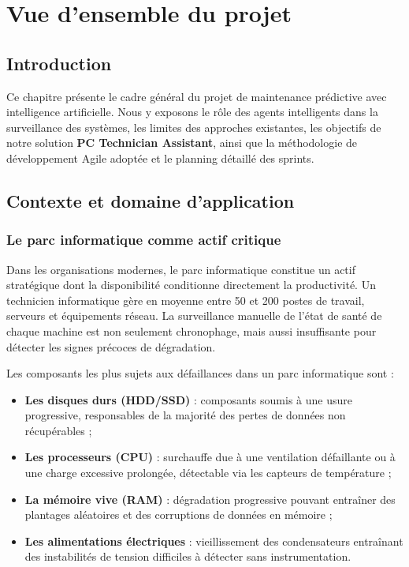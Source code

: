 \chapter{Vue d'ensemble du projet}

\section{Introduction}

Ce chapitre présente le cadre général du projet de maintenance prédictive avec intelligence
artificielle. Nous y exposons le rôle des agents intelligents dans la surveillance des
systèmes, les limites des approches existantes, les objectifs de notre solution
\textbf{PC Technician Assistant}, ainsi que la méthodologie de développement Agile adoptée
et le planning détaillé des sprints.

\section{Contexte et domaine d'application}

\subsection{Le parc informatique comme actif critique}

Dans les organisations modernes, le parc informatique constitue un actif stratégique dont
la disponibilité conditionne directement la productivité. Un technicien informatique gère
en moyenne entre 50 et 200 postes de travail, serveurs et équipements réseau. La surveillance
manuelle de l'état de santé de chaque machine est non seulement chronophage, mais aussi
insuffisante pour détecter les signes précoces de dégradation.

Les composants les plus sujets aux défaillances dans un parc informatique sont :
\begin{itemize}
  \item \textbf{Les disques durs (HDD/SSD)} : composants soumis à une usure progressive,
        responsables de la majorité des pertes de données non récupérables ;
  \item \textbf{Les processeurs (CPU)} : surchauffe due à une ventilation défaillante ou
        à une charge excessive prolongée, détectable via les capteurs de température ;
  \item \textbf{La mémoire vive (RAM)} : dégradation progressive pouvant entraîner des
        plantages aléatoires et des corruptions de données en mémoire ;
  \item \textbf{Les alimentations électriques} : vieillissement des condensateurs entraînant
        des instabilités de tension difficiles à détecter sans instrumentation.
\end{itemize}

